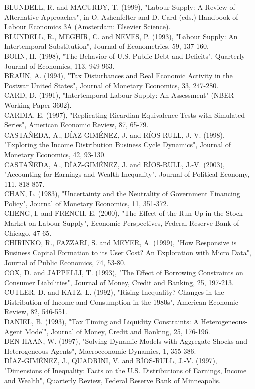 \documentclass[11pt]{article}
\begin{document}
BLUNDELL, R. and MACURDY, T. (1999), "Labour Supply: A Review of Alternative Approaches", in O. Ashenfelter and D. Card (eds.) Handbook of Labour Economics 3A (Amsterdam: Elsevier Science).\\
BLUNDELL, R., MEGHIR, C. and NEVES, P. (1993), "Labour Supply: An Intertemporal Substitution", Journal of Econometrics, 59, 137-160.\\
BOHN, H. (1998), "The Behavior of U.S. Public Debt and Deficits", Quarterly Journal of Economics, 113, 949-963.\\
BRAUN, A. (1994), "Tax Disturbances and Real Economic Activity in the Postwar United States", Journal of Monetary Economics, 33, 247-280.\\
CARD, D. (1991), "Intertemporal Labour Supply: An Assessment" (NBER Working Paper 3602).\\
CARDIA, E. (1997), "Replicating Ricardian Equivalence Tests with Simulated Series", American Economic Review, 87, 65-79.\\
CASTAÑEDA, A., DÍAZ-GIMÉNEZ, J. and RÍOS-RULL, J.-V. (1998), "Exploring the Income Distribution Business Cycle Dynamics", Journal of Monetary Economics, 42, 93-130.\\
CASTAÑEDA, A., DÍAZ-GIMÉNEZ, J. and RÍOS-RULL, J.-V. (2003), "Accounting for Earnings and Wealth Inequality", Journal of Political Economy, 111, 818-857.\\
CHAN, L. (1983), "Uncertainty and the Neutrality of Government Financing Policy", Journal of Monetary Economics, 11, 351-372.\\
CHENG, I. and FRENCH, E. (2000), "The Effect of the Run Up in the Stock Market on Labour Supply", Economic Perspectives, Federal Reserve Bank of Chicago, 47-65.\\
CHIRINKO, R., FAZZARI, S. and MEYER, A. (1999), "How Responsive is Business Capital Formation to its User Cost? An Exploration with Micro Data", Journal of Public Economics, 74, 53-80.\\
COX, D. and JAPPELLI, T. (1993), "The Effect of Borrowing Constraints on Consumer Liabilities", Journal of Money, Credit and Banking, 25, 197-213.\\
CUTLER, D. and KATZ, L. (1992), "Rising Inequality? Changes in the Distribution of Income and Consumption in the 1980s", American Economic Review, 82, 546-551.\\
DANIEL, B. (1993), "Tax Timing and Liquidity Constraints: A Heterogeneous-Agent Model", Journal of Money, Credit and Banking, 25, 176-196.\\
DEN HAAN, W. (1997), "Solving Dynamic Models with Aggregate Shocks and Heterogeneous Agents", Macroeconomic Dynamics, 1, 355-386.\\
DÍAZ-GIMÉNEZ, J., QUADRINI, V. and RÍOS-RULL, J.-V. (1997), "Dimensions of Inequality: Facts on the U.S. Distributions of Earnings, Income and Wealth", Quarterly Review, Federal Reserve Bank of Minneapolis.
\end{document}
